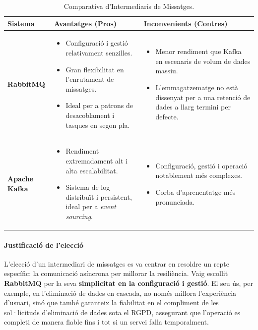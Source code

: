 \begin{table}[h]
\centering
\begin{tabular}{|l|p{4.5cm}|p{4.5cm}|}
\hline
\textbf{Sistema} & \textbf{Avantatges (Pros)} & \textbf{Inconvenients (Contres)} \\
\hline
\textbf{RabbitMQ} & 
\begin{itemize}
    \item Configuració i gestió relativament senzilles.
    \item Gran flexibilitat en l'enrutament de missatges.
    \item Ideal per a patrons de desacoblament i tasques en segon pla.
\end{itemize} & 
\begin{itemize}
    \item Menor rendiment que Kafka en escenaris de volum de dades massiu.
    \item L'emmagatzematge no està dissenyat per a una retenció de dades a llarg termini per defecte.
\end{itemize} \\
\hline
\textbf{Apache Kafka} & 
\begin{itemize}
    \item Rendiment extremadament alt i alta escalabilitat.
    \item Sistema de log distribuït i persistent, ideal per a \textit{event sourcing}.
\end{itemize} & 
\begin{itemize}
    \item Configuració, gestió i operació notablement més complexes.
    \item Corba d'aprenentatge més pronunciada.
\end{itemize} \\
\hline
\end{tabular}
\caption{Comparativa d'Intermediaris de Missatges.}
\label{tab:message_brokers_comparison}
\end{table}

\paragraph{Justificació de l'elecció}
L'elecció d'un intermediari de missatges es va centrar en resoldre un repte específic: la comunicació asíncrona per millorar la resiliència. Vaig escollit \textbf{RabbitMQ} per la seva \textbf{simplicitat en la configuració i gestió}. El seu ús, per exemple, en l'eliminació de dades en cascada, no només millora l'experiència d'usuari, sinó que també garanteix la fiabilitat en el compliment de les sol·licituds d'eliminació de dades sota el RGPD, assegurant que l'operació es completi de manera fiable fins i tot si un servei falla temporalment.

